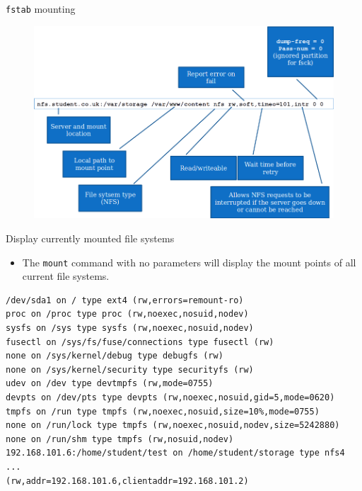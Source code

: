 \documentclass[xcolor=table]{beamer}
\begin{document}
\begin{frame}{\texttt{fstab} mounting}
  \begin{figure}
    \begin{center}
      \includegraphics[width=1\linewidth]{fstab.png}
    \end{center}
  \end{figure}
\end{frame}

\begin{frame}[fragile]{Display currently mounted file systems}
  \begin{itemize}
    \item The \texttt{mount} command with no parameters will display the mount points of all current file systems.
  \end{itemize}
  \begin{tcolorbox}
    \lstset{
      basicstyle=\tiny\ttfamily,
    }
    \begin{lstlisting}
/dev/sda1 on / type ext4 (rw,errors=remount-ro)
proc on /proc type proc (rw,noexec,nosuid,nodev)
sysfs on /sys type sysfs (rw,noexec,nosuid,nodev)
fusectl on /sys/fs/fuse/connections type fusectl (rw)
none on /sys/kernel/debug type debugfs (rw)
none on /sys/kernel/security type securityfs (rw)
udev on /dev type devtmpfs (rw,mode=0755)
devpts on /dev/pts type devpts (rw,noexec,nosuid,gid=5,mode=0620)
tmpfs on /run type tmpfs (rw,noexec,nosuid,size=10%,mode=0755)
none on /run/lock type tmpfs (rw,noexec,nosuid,nodev,size=5242880)
none on /run/shm type tmpfs (rw,nosuid,nodev)
192.168.101.6:/home/student/test on /home/student/storage type nfs4 ...
(rw,addr=192.168.101.6,clientaddr=192.168.101.2)
    \end{lstlisting}
  \end{tcolorbox}
\end{frame}
\end{document}
